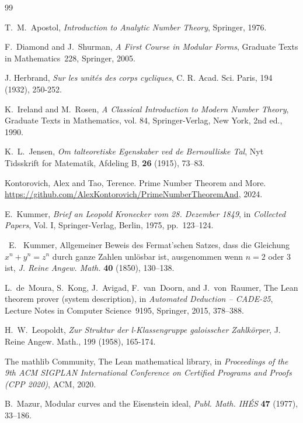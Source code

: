 \documentclass[12pt]{amsart}
\theoremstyle{plain}
\theoremstyle{definition}
\begin{document}
\begin{thebibliography}{99}

T.~M.~Apostol,
\emph{Introduction to Analytic Number Theory},
Springer, 1976.

F.~Diamond and J.~Shurman,
\emph{A First Course in Modular Forms},
Graduate Texts in Mathematics~228, Springer, 2005.

 J. Herbrand, \textit{Sur les unit\'es des corps cycliques}, C. R. Acad. Sci. Paris, 194 (1932), 250-252.

K.~Ireland and M.~Rosen,
\emph{A Classical Introduction to Modern Number Theory},
Graduate Texts in Mathematics, vol. 84, Springer-Verlag, New York, 2nd ed., 1990.

K.~L.~Jensen,
\textit{Om talteoretiske Egenskaber ved de Bernoulliske Tal},
Nyt Tidsskrift for Matematik, Afdeling B, \textbf{26} (1915), 73--83.

Kontorovich, Alex and Tao, Terence.
Prime Number Theorem and More.
\url{https://github.com/AlexKontorovich/PrimeNumberTheoremAnd}, 2024.

E.~Kummer,
\textit{Brief an Leopold Kronecker vom 28. Dezember 1849},
in \textit{Collected Papers}, Vol. I, Springer-Verlag, Berlin, 1975, pp.~123--124.

~E. ~Kummer,
Allgemeiner Beweis des Fermat'schen Satzes, dass die Gleichung
$x^n+y^n=z^n$ durch ganze Zahlen unl\"osbar ist, ausgenommen wenn $n=2$ oder $3$ ist,
\emph{J. Reine Angew. Math.} \textbf{40} (1850), 130--138.

L.~de~Moura, S.~Kong, J.~Avigad, F.~van~Doorn, and J.~von~Raumer,
The {L}ean theorem prover (system description),
in \emph{Automated Deduction -- CADE-25},
Lecture Notes in Computer Science~9195, Springer, 2015, 378--388.

 H.~W.~Leopoldt, \textit{Zur Struktur der l-Klassengruppe galoisscher Zahlk\"orper}, J. Reine Angew. Math., 199 (1958), 165-174.

The mathlib Community,
The {L}ean mathematical library,
in \emph{Proceedings of the 9th ACM SIGPLAN International Conference on
Certified Programs and Proofs (CPP 2020)},
ACM, 2020.

B.~Mazur,
Modular curves and the Eisenstein ideal,
\emph{Publ. Math. IH\'ES} \textbf{47} (1977), 33--186.


\end{thebibliography}
\end{document}
